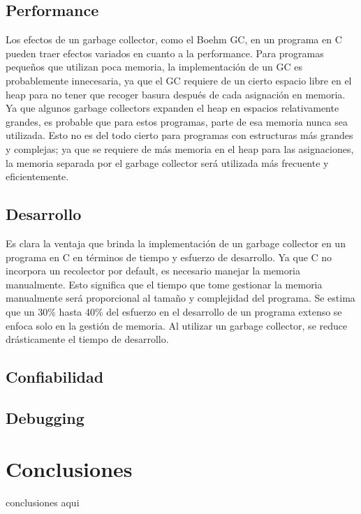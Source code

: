 \documentclass[11pt]{article} %
\begin{document}
\subsection{Performance}
	Los efectos de un garbage collector, como el Boehm GC, en un programa en C pueden traer efectos variados en cuanto a la performance. Para programas pequeños que utilizan poca memoria, la implementación de un GC es probablemente innecesaria, ya que el GC requiere de un cierto espacio libre en el heap para no tener que recoger basura después de cada asignación en memoria. Ya que algunos garbage collectors expanden el heap en espacios relativamente grandes, es probable que para estos programas, parte de esa memoria nunca sea utilizada. Esto no es del todo cierto para programas con estructuras más grandes y complejas; ya que se requiere de más memoria en el heap para las asignaciones, la memoria separada por el garbage collector será utilizada más frecuente y eficientemente.
\subsection{Desarrollo}
	Es clara la ventaja que brinda la implementación de un garbage collector en un programa en C en términos de tiempo y esfuerzo de desarrollo. Ya que C no incorpora un recolector por default, es necesario manejar la memoria manualmente. Esto significa que el tiempo que tome gestionar la memoria manualmente será proporcional al tamaño y complejidad del programa. Se estima que un 30\% hasta 40\% del esfuerzo en el desarrollo de un programa extenso se enfoca solo en la gestión de memoria. Al utilizar un garbage collector, se reduce drásticamente el tiempo de desarrollo.
\subsection{Confiabilidad}
\subsection{Debugging}

\section{Conclusiones}

conclusiones aqui
\end{document}
